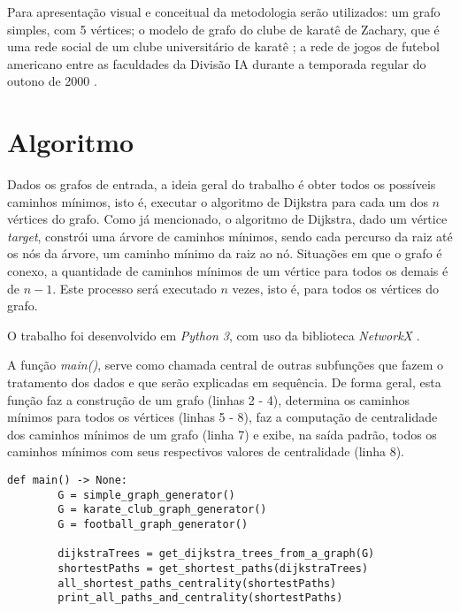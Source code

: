 Para apresentação visual e conceitual da metodologia serão utilizados: um grafo simples, com 5 vértices; o modelo de grafo do clube de karatê de Zachary, que é uma rede social de um clube universitário de karatê \cite{zachary2009}; a rede de jogos de futebol americano entre as faculdades da Divisão IA durante a temporada regular do outono de 2000 \cite{networkxfootball2021}.

\section{Algoritmo}
Dados os grafos de entrada, a ideia geral do trabalho é obter todos os possíveis caminhos mínimos, isto é, executar o algoritmo de Dijkstra para cada um dos $n$ vértices do grafo. Como já mencionado, o algoritmo de Dijkstra, dado um vértice \emph{target}, constrói uma árvore de caminhos mínimos, sendo cada percurso da raiz até os nós da árvore, um caminho mínimo da raiz ao nó. Situações em que o grafo é conexo, a quantidade de caminhos mínimos de um vértice para todos os demais é de $n - 1$. Este processo será executado $n$ vezes, isto é, para todos os vértices do grafo.

O trabalho foi desenvolvido em \emph{Python 3}, com uso da biblioteca \emph{NetworkX} \cite{networkx2021}.

A função \emph{main()}, serve como chamada central de outras subfunções que fazem o tratamento dos dados e que serão explicadas em sequência. De forma geral, esta função faz a construção de um grafo (linhas 2 - 4), determina os caminhos mínimos para todos os vértices (linhas 5 - 8), faz a computação de centralidade dos caminhos mínimos de um grafo (linha 7) e exibe, na saída padrão, todos os caminhos mínimos com seus respectivos valores de centralidade (linha 8).

\begin{lstlisting}[caption={Função central para chamada de subfunções.}]
	def main() -> None:
		G = simple_graph_generator()
		G = karate_club_graph_generator()
		G = football_graph_generator()

		dijkstraTrees = get_dijkstra_trees_from_a_graph(G)
		shortestPaths = get_shortest_paths(dijkstraTrees)
		all_shortest_paths_centrality(shortestPaths)
		print_all_paths_and_centrality(shortestPaths)
\end{lstlisting}

